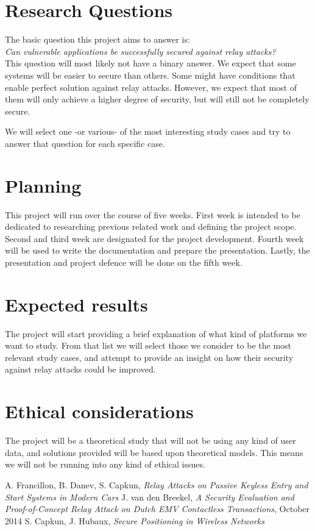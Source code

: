 \documentclass{article}
\begin{document}
\section{Research Questions}
The basic question this project aims to answer is:\\

\emph{Can vulnerable applications be successfully secured against relay attacks?}\\

This question will most likely not have a binary answer. We expect that some systems will be easier to secure than others. Some might have conditions that enable perfect solution against relay attacks. However, we expect that most of them will only achieve a higher degree of security, but will still not be completely secure.

We will select one -or various- of the most interesting study cases and try to answer that question for each specific case.

\section{Planning}
This project will run over the course of five weeks. First week is intended to be dedicated to researching previous related work and defining the project scope. Second and third week are designated for the project development. Fourth week will be used to write the documentation and prepare the presentation. Lastly, the presentation and project defence will be done on the fifth week.

\section{Expected results}
The project will start providing a brief explanation of what kind of platforms we want to study. From that list we will select those we consider to be the most relevant study cases, and attempt to provide an insight on how their security against relay attacks could be improved.

\section{Ethical considerations}
The project will be a theoretical study that will not be using any kind of user data, and solutions provided will be based upon theoretical models. This means we will not be running into any kind of ethical issues.

\begin{thebibliography}{99}
A. Francillon, B. Danev, S. Capkun, \emph{Relay Attacks on Passive Keyless Entry and Start Systems in Modern Cars}
J. van den Breekel, \emph{A Security Evaluation and Proof-of-Concept Relay Attack on Dutch EMV Contactless Transactions}, October 2014
S. Capkun, J. Hubaux, \emph{Secure Positioning in Wireless Networks}
\end{thebibliography}
\end{document}
